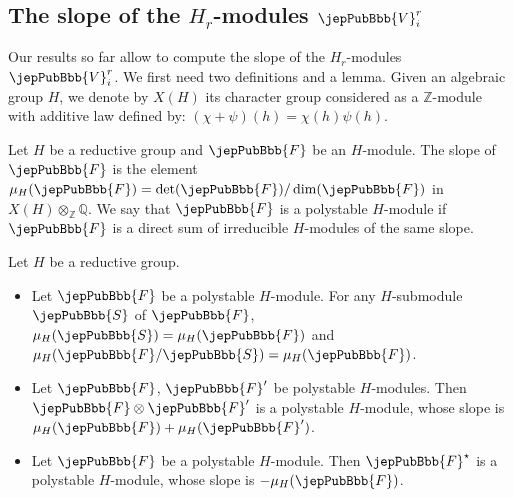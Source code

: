 \subsection{The slope of the $H_r$-modules $\jepPubBbb{V}^r_i$}
Our results so far allow to compute the slope of the $H_r$-modules $\jepPubBbb{V}^r_i$. We first need two definitions and a lemma. Given an algebraic group $H$, we denote by $X(H)$ its character group considered as a $\mathbb Z$-module with additive law defined by: $(\chi+\psi)(h)=\chi(h)\psi(h)$.
\begin{definition}
Let $H$ be a reductive group and $\jepPubBbb{F}$ be an $H$-module. The slope of $\jepPubBbb{F}$ is the element $\mu_H(\jepPubBbb{F})=\det(\jepPubBbb{F})/\dim(\jepPubBbb{F})$ in $X(H)\otimes_{\mathbb Z}\mathbb Q$. We say that $\jepPubBbb{F}$ is a polystable $H$-module if $\jepPubBbb{F}$ is a direct sum of irreducible $H$-modules of the same slope.
\end{definition}
\begin{lemma}
Let $H$ be a reductive group.
\begin{itemize}
\item Let $\jepPubBbb{F}$ be a polystable $H$-module. For any $H$-submodule $\jepPubBbb{S}$ of $\jepPubBbb{F}$, $\mu_H(\jepPubBbb{S})=\mu_H(\jepPubBbb{F})$ and $\mu_H(\jepPubBbb{F}/\jepPubBbb{S})=\mu_H(\jepPubBbb{F})$.
\item Let $\jepPubBbb{F}$, $\jepPubBbb{F}'$ be polystable $H$-modules. Then $\jepPubBbb{F}\otimes \jepPubBbb{F}'$ is a polystable $H$-module, whose slope is $\mu_H(\jepPubBbb{F})+\mu_H(\jepPubBbb{F}')$.
\item Let $\jepPubBbb{F}$ be a polystable $H$-module. Then $\jepPubBbb{F}^\star$ is a polystable $H$-module, whose slope is $-\mu_H(\jepPubBbb{F})$.
\end{itemize}
\end{lemma}

